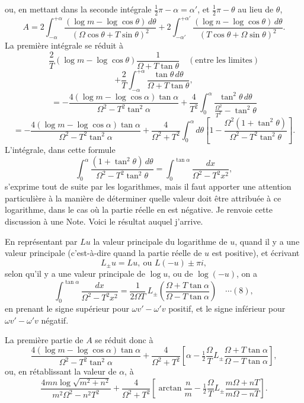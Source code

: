\documentclass[12pt,a4paper]{article}
\begin{document}
\newpage
\setcounter{page}{160}

ou, en mettant dans la seconde int\'egrale $\tfrac{1}{2}\pi - \alpha = \alpha'$, et $\tfrac{1}{2}\pi - \theta$ au lieu de $\theta$,
\[
A = 2\int_{-\alpha}^{+\alpha}\frac{(\log m - \log\cos\theta)\,d\theta}{(\Omega\cos\theta + T\sin\theta)^2} + 2\int_{-\alpha'}^{+\alpha'}\frac{(\log n - \log\cos\theta)\,d\theta}{(T\cos\theta + \Omega\sin\theta)^2}.
\]
La premi\`ere int\'egrale se r\'eduit \`a
\[
\frac{2}{T}(\log m - \log\cos\theta)\frac{1}{\Omega + T\tan\theta}\quad(\text{entre les limites})
\]
\[
+ \frac{2}{T}\int_{-\alpha}^{+\alpha}\frac{\tan\theta\,d\theta}{\Omega + T\tan\theta},
\]
\[
= -\frac{4(\log m - \log\cos\alpha)\tan\alpha}{\Omega^2 - T^2\tan^2\alpha} + \frac{4}{T^2}\int_0^{\alpha}\frac{\tan^2\theta\,d\theta}{\frac{\Omega^2}{T^2} - \tan^2\theta}
\]
\[
= -\frac{4(\log m - \log\cos\alpha)\tan\alpha}{\Omega^2 - T^2\tan^2\alpha} + \frac{4}{\Omega^2 + T^2}\int_0^{\alpha}d\theta\!\left[1 - \frac{\Omega^2(1+\tan^2\theta)}{\Omega^2 - T^2\tan^2\theta}\right].
\]
L'int\'egrale, dans cette formule
\[
\int_0^\alpha\frac{(1+\tan^2\theta)\,d\theta}{\Omega^2 - T^2\tan^2\theta} = \int_0^{\tan\alpha}\frac{dx}{\Omega^2 - T^2 x^2},
\]
s'exprime tout de suite par les logarithmes, mais il faut apporter une attention particuli\`ere \`a la mani\`ere de d\'eterminer quelle valeur doit \^etre attribu\'ee \`a ce logarithme, dans le cas o\`u la partie r\'eelle en est n\'egative. Je renvoie cette discussion \`a une Note. Voici le r\'esultat auquel j'arrive.

En repr\'esentant par $Lu$ la valeur principale du logarithme de $u$, quand il y a une valeur principale (c'est-\`a-dire quand la partie r\'eelle de $u$ est positive), et \'ecrivant
\[
L_{\pm}u = Lu,\ \text{ou } L(-u) \pm \pi i,
\]
selon qu'il y a une valeur principale de $\log u$, ou de $\log(-u)$, on a
\[
\int_0^{\tan\alpha}\frac{dx}{\Omega^2 - T^2 x^2} = \frac{1}{2\Omega T}\,L_{\pm}\!\left(\frac{\Omega + T\tan\alpha}{\Omega - T\tan\alpha}\right) \quad\cdots(8),
\]
en prenant le signe sup\'erieur pour $\omega v' - \omega' v$ positif, et le signe inf\'erieur pour $\omega v' - \omega' v$ n\'egatif.

La premi\`ere partie de $A$ se r\'eduit donc \`a
\[
\frac{4(\log m - \log\cos\alpha)\tan\alpha}{\Omega^2 - T^2\tan^2\alpha} + \frac{4}{\Omega^2 + T^2}\!\left[\alpha - \tfrac{1}{2}\frac{\Omega}{T}L_{\pm}\frac{\Omega + T\tan\alpha}{\Omega - T\tan\alpha}\right],
\]
ou, en r\'etablissant la valeur de $\alpha$, \`a
\[
\frac{4mn\log\sqrt{m^2 + n^2}}{m^2\Omega^2 - n^2 T^2} + \frac{4}{\Omega^2 + T^2}\!\left[\arctan\frac{n}{m} - \tfrac{1}{2}\frac{\Omega}{T}L_{\pm}\frac{m\Omega + nT}{m\Omega - nT}\right].
\]
\end{document}
